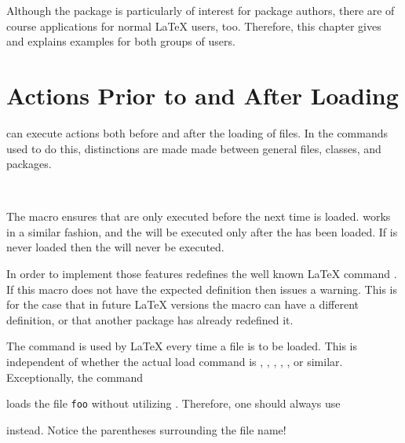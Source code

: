 Although the package is particularly of interest for package authors, there
are of course applications for normal {\LaTeX} users, too.  Therefore, this
chapter gives and explains examples for both groups of users.


\section{Actions Prior to and After Loading}

 can execute actions both before and after the
loading of files. In the commands used to do this, distinctions are
made made between general files, classes, and packages.

\begin{Declaration}
  \\
\end{Declaration}%
%
%
The macro  ensures that  are
only executed before the next time  is loaded.
 works in a similar fashion, and the
 will be executed only after the  has
been loaded.  If  is never loaded then the
 will never be executed.

In order to implement those features  redefines the well
known {\LaTeX} command . If this macro does not have
the expected definition then  issues a warning.  This is for
the case that in future {\LaTeX} versions the macro can have a different
definition, or that another package has already redefined it.
  
The command  is used by {\LaTeX} every time a file is
to be loaded.  This is independent of whether the actual load command is
, , , ,
, or similar. Exceptionally, the command
\begin{lstcode}[belowskip=\dp\strutbox]
  
\end{lstcode}
loads the file \texttt{foo} without utilizing
. Therefore, one should always use
\begin{lstcode}[belowskip=\dp\strutbox]
  
\end{lstcode}
instead. Notice the parentheses surrounding the file name!%
%
%
%

